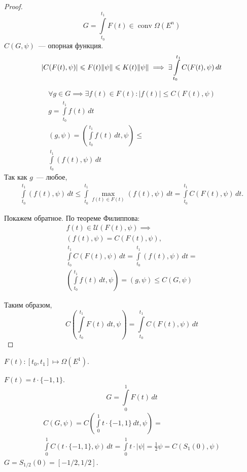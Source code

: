 \begin{proof}
    \begin{equation*}
        G = \int\limits_{t_0}^{t_1} F(t) \in \operatorname{conv}\Omega(E^n)
    \end{equation*}
    $C(G, \psi)$~--- опорная функция.
    \begin{equation*}
        |C(F(t), \psi) | \leqslant F(t) \lVert \psi \rVert \leqslant K(t) \lVert \psi \rVert \implies \exists \int\limits_{t_0}^{t_1} C(F(t), \psi) \, dt 
    \end{equation*}

    \begin{gather*}
        \forall g \in G \implies \exists f(t) \in F(t)\colon |f(t)| \leqslant C(F(t), \psi)\\
        g = \int\limits_{t_0}^{t_1} f(t)\, dt \\
        (g, \psi) = \left( \int\limits_{t_0}^{t_1} f(t)\, dt, \psi \right) \leqslant \\
        \int\limits_{t_0}^{t_1} (f(t), \psi) \, dt
    \end{gather*}
    Так как $g$~--- любое,
    \begin{gather*}
        \int\limits_{t_0}^{t_1} (f(t), \psi) \, dt \leqslant
        \int\limits_{t_0}^{t_1} \max\limits_{f(t) \in F(t)}(f(t), \psi) \, dt = 
        \int\limits_{t_0}^{t_1} C(F(t), \psi) \, dt.
    \end{gather*}

    Покажем обратное. По теореме Филиппова:
    \begin{gather*}
        f(t) \in \mathcal{U}(F(t), \psi) \implies \\
        (f(t), \psi) = C(F(t), \psi), \\
        \int\limits_{t_0}^{t_1} C(F(t), \psi) \, dt = 
        \int\limits_{t_0}^{t_1} (f(t), \psi) \, dt = \\ 
        \left( \int\limits_{t_0}^{t_1} f(t) \, dt, \psi \right) =
        (g, \psi) \leqslant C(G, \psi)
    \end{gather*}

    Таким образом, 
    \begin{equation*}
        C\left( \int\limits_{t_0}^{t_1} F(t) \, dt, \psi \right) = 
        \int\limits_{t_0}^{t_1} C(F(t), \psi) \, dt 
    \end{equation*}
\end{proof}

\begin{exmp}
    $F(t)\colon [t_0, t_1] \mapsto \Omega(E^1)$.

    $F(t) = t \cdot \{-1, 1\}$.
    \begin{equation*}
        G = \int\limits_{0}^{1} F(t) \, dt
    \end{equation*}
    \begin{gather*}
        C(G, \psi) =
        C\left( \int\limits_{0}^{1} t\cdot\{-1, 1\} \, dt, \psi \right) = \\
        \int\limits_{0}^{1} C(t \cdot \{-1, 1\}, \psi) \, dt = 
        \int\limits_{0}^{1} t \cdot |\psi| = \frac{1}{2} \psi = C(S_1(0), \psi)
    \end{gather*}
    $G = S_{1/2}(0) = [-1/2, 1/2]$.
\end{exmp}

